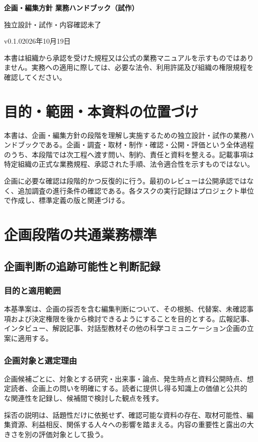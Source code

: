 \documentclass[a4paper,11pt]{article}
\begin{document}
\begin{center}
{\Large\bfseries 企画・編集方針 業務ハンドブック（試作）}\par\medskip
{\small 独立設計・試作・内容確認未了}\par
{\small v0.1.0\quad 2026年10月19日}\par
\end{center}
\vspace{6mm}
\noindent 本書は組織から承認を受けた規程又は公式の業務マニュアルを示すものではありません。実務への適用に際しては、必要な法令、利用許諾及び組織の権限規程を確認してください。\par
\tableofcontents
\clearpage
\section{目的・範囲・本資料の位置づけ}
\par 本書は、企画・編集方針の段階を理解し実施するための独立設計・試作の業務ハンドブックである。企画・調査・取材・制作・確認・公開・評価という全体過程のうち、本段階では次工程へ渡す問い、制約、責任と資料を整える。記載事項は特定組織の正式な業務規程、承認された手順、法令適合性を示すものではない。\par\medskip
\par 企画に必要な確認は段階的かつ反復的に行う。最初のレビューは公開承認ではなく、追加調査の進行条件の確認である。各タスクの実行記録はプロジェクト単位で作成し、標準定義の版と関連づける。\par\medskip
\section{企画段階の共通業務標準}
\subsection{企画判断の追跡可能性と判断記録}
\subsubsection{目的と適用範囲}
\par 本基準案は、企画の採否を含む編集判断について、その根拠、代替案、未確認事項および決定権限を後から検討できるようにすることを目的とする。広報記事、インタビュー、解説記事、対話型教材その他の科学コミュニケーション企画の立案に適用する。\par\medskip
\subsubsection{企画対象と選定理由}
\par 企画候補ごとに、対象とする研究・出来事・論点、発生時点と資料公開時点、想定読者、企画上の問いを明確にする。読者に提供し得る知識上の価値と公共的な関連性を記録し、候補間で検討した観点を残す。\par\medskip
\par 採否の説明は、話題性だけに依拠せず、確認可能な資料の存在、取材可能性、編集資源、利益相反、関係する人々への影響を踏まえる。内容の重要性と露出の大きさを別の評価対象として扱う。\par\medskip
\end{document}
